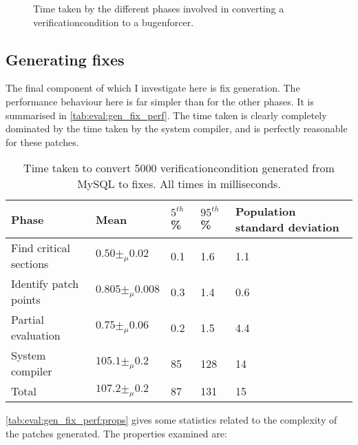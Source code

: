 \begin{figure}
  
  \caption{Time taken by the different phases involved in converting a
    \gls{verificationcondition} to a \gls{bugenforcer}.}
  \label{fig:eval:time_breakdown:convert_to_enforcer}
\end{figure}

\subsection{Generating fixes}
\label{sect:eval:genfix}

The final component of {\technique} which I investigate here is fix
generation.  The performance behaviour here is far simpler than for
the other phases.  It is summarised in
\autoref{tab:eval:gen_fix_perf}.  The time taken is clearly completely
dominated by the time taken by the system compiler, and is perfectly
reasonable for these patches.

\begin{table}
  \begin{tabular}{|l|l|l|l|l|}
    \hline
    Phase & Mean & $5^{th}$\% & $95^{th}$\% & Population standard deviation \\
    \hline
    Find critical sections & $0.50 \pm_\mu 0.02$ & 0.1 & 1.6 & 1.1 \\
    Identify patch points & $0.805 \pm_\mu 0.008$ & 0.3 & 1.4 & 0.6 \\
    Partial evaluation & $0.75 \pm_\mu 0.06$ & 0.2 & 1.5 & 4.4 \\
    System compiler & $105.1 \pm_\mu 0.2$ & 85 & 128 & 14 \\
    \hline
    Total & $107.2 \pm_\mu 0.2$ & 87 & 131 & 15 \\
    \hline
  \end{tabular}
  \caption{Time taken to convert 5000 \gls{verificationcondition}
    generated from MySQL to fixes.  All times in milliseconds.}
  \label{tab:eval:gen_fix_perf}
\end{table}

\autoref{tab:eval:gen_fix_perf:props} gives some statistics related to
the complexity of the patches generated.  The properties examined are:

